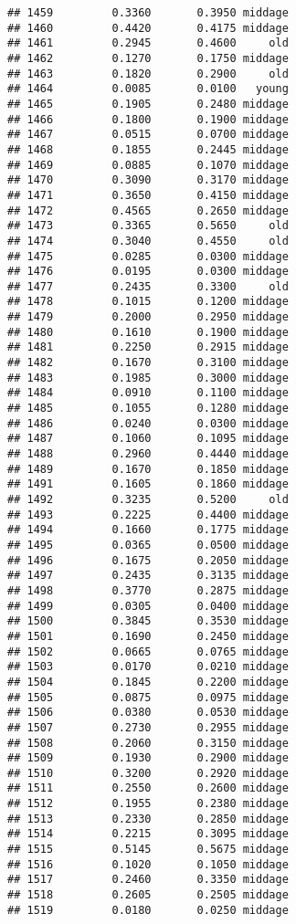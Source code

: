 \documentclass[
]{article}
\begin{document}
\begin{verbatim}
## 1459         0.3360       0.3950 middage
## 1460         0.4420       0.4175 middage
## 1461         0.2945       0.4600     old
## 1462         0.1270       0.1750 middage
## 1463         0.1820       0.2900     old
## 1464         0.0085       0.0100   young
## 1465         0.1905       0.2480 middage
## 1466         0.1800       0.1900 middage
## 1467         0.0515       0.0700 middage
## 1468         0.1855       0.2445 middage
## 1469         0.0885       0.1070 middage
## 1470         0.3090       0.3170 middage
## 1471         0.3650       0.4150 middage
## 1472         0.4565       0.2650 middage
## 1473         0.3365       0.5650     old
## 1474         0.3040       0.4550     old
## 1475         0.0285       0.0300 middage
## 1476         0.0195       0.0300 middage
## 1477         0.2435       0.3300     old
## 1478         0.1015       0.1200 middage
## 1479         0.2000       0.2950 middage
## 1480         0.1610       0.1900 middage
## 1481         0.2250       0.2915 middage
## 1482         0.1670       0.3100 middage
## 1483         0.1985       0.3000 middage
## 1484         0.0910       0.1100 middage
## 1485         0.1055       0.1280 middage
## 1486         0.0240       0.0300 middage
## 1487         0.1060       0.1095 middage
## 1488         0.2960       0.4440 middage
## 1489         0.1670       0.1850 middage
## 1491         0.1605       0.1860 middage
## 1492         0.3235       0.5200     old
## 1493         0.2225       0.4400 middage
## 1494         0.1660       0.1775 middage
## 1495         0.0365       0.0500 middage
## 1496         0.1675       0.2050 middage
## 1497         0.2435       0.3135 middage
## 1498         0.3770       0.2875 middage
## 1499         0.0305       0.0400 middage
## 1500         0.3845       0.3530 middage
## 1501         0.1690       0.2450 middage
## 1502         0.0665       0.0765 middage
## 1503         0.0170       0.0210 middage
## 1504         0.1845       0.2200 middage
## 1505         0.0875       0.0975 middage
## 1506         0.0380       0.0530 middage
## 1507         0.2730       0.2955 middage
## 1508         0.2060       0.3150 middage
## 1509         0.1930       0.2900 middage
## 1510         0.3200       0.2920 middage
## 1511         0.2550       0.2600 middage
## 1512         0.1955       0.2380 middage
## 1513         0.2330       0.2850 middage
## 1514         0.2215       0.3095 middage
## 1515         0.5145       0.5675 middage
## 1516         0.1020       0.1050 middage
## 1517         0.2460       0.3350 middage
## 1518         0.2605       0.2505 middage
## 1519         0.0180       0.0250 middage

\end{verbatim}
\end{document}
